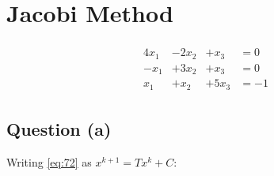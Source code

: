 \section{Jacobi Method}
	
	\begin{align}
		\begin{matrix}
			4x_{1} & - 2x_{2} & + x_{3} &= 0 \\
			-x_{1} & + 3x_{2} & + x_{3} &= 0 \\
			x_{1} & + x_{2} & + 5x_{3} &= -1
		\end{matrix}
	\label{eq:72}
	\end{align}

	\subsection{Question (a)}

		Writing \cref{eq:72} as $x^{k+1} = Tx^{k} + C$:

